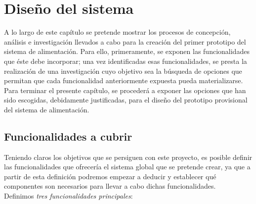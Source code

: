 \documentclass[12pt]{article}
\begin{document}
	\pagebreak
	
	\section[Diseño del sistema]{Diseño del sistema}
	\label{Sección 3: Diseño del sistema}
	\noindent A lo largo de este capítulo se pretende mostrar los procesos de concepción, análisis e investigación llevados a cabo para la creación del primer prototipo del sistema de alimentación. Para ello, primeramente, se exponen las funcionalidades que éste debe incorporar; una vez identificadas esas funcionalidades, se presta la realización de una investigación cuyo objetivo sea la búsqueda de opciones que permitan que cada funcionalidad anteriormente expuesta pueda materializarse. Para terminar el presente capítulo, se procederá a exponer las opciones que han sido escogidas, debidamente justificadas, para el diseño del prototipo provisional del sistema de alimentación. 
	
	\subsection[Funcionalidades a cubrir]{Funcionalidades a cubrir}
	
	\noindent Teniendo claros los objetivos que se persiguen con este proyecto, es posible definir las funcionalidades que ofrecería el sistema global que se pretende crear, ya que a partir de esta definición podremos empezar a deducir y establecer qué componentes son necesarios para llevar a cabo dichas funcionalidades. \\
	
	\noindent Definimos \textit{tres funcionalidades principales}: 
	
\end{document}
